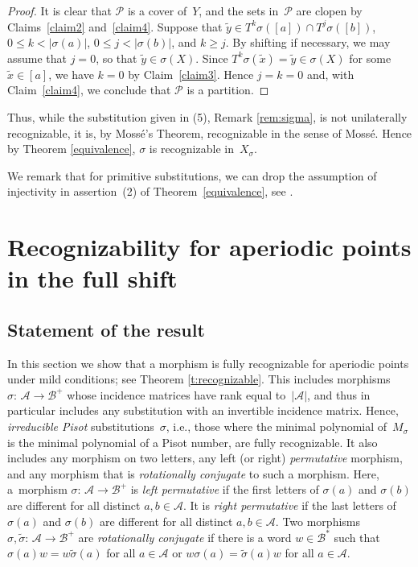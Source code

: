 \documentclass{amsart}
\theoremstyle{definition}
\theoremstyle{remark}
\numberwithin{equation}{section}
\begin{document}
\begin{proof}
It is clear that $\mathcal{P}$ is a cover of~$Y$, and the sets in~$\mathcal{P}$ are clopen by Claims~\ref{claim2} and~\ref{claim4}.  
Suppose that $\tilde{y} \in T^k \sigma([a]) \cap T^j \sigma([b])$, 
$0 \le k<|\sigma(a)|$, $0 \le j<|\sigma(b)|$, and $k\geq j$.
By shifting if necessary, we may assume that $j=0$, so that $\tilde{y} \in \sigma(X)$. 
Since $T^k \sigma(\tilde{x}) = \tilde{y} \in \sigma(X)$ for some $\tilde{x} \in [a]$, we have $k = 0$ by Claim~\ref{claim3}. 
Hence $j = k = 0$ and, with Claim~\ref{claim4}, we conclude that $\mathcal{P}$ is a partition. 
\end{proof}

Thus, while the substitution given in (5), Remark  \ref{rem:sigma}, is not unilaterally recognizable, it is, by Moss\'{e}'s Theorem,  recognizable in the sense of Moss\'{e}. Hence by Theorem \ref{equivalence}, $\sigma$ is recognizable in~$X_\sigma$.

We remark that for primitive substitutions, we can drop the assumption of injectivity in assertion~(2) of Theorem~\ref{equivalence}, see \cite{Mosse:92}. 



\section{Recognizability for aperiodic points in the full shift} \label{sec:recogn-with-resp}

\subsection{Statement of the result}
In this section we show that a morphism is fully recognizable for aperiodic points under mild conditions; see Theorem \ref{t:recognizable}. 
This includes morphisms $\sigma:\, \mathcal{A} \rightarrow \mathcal{B}^+$ whose incidence matrices have rank equal to~$|\mathcal{A}|$, and thus in particular includes any substitution with an invertible incidence matrix. 
Hence, \emph{irreducible Pisot} substitutions~$\sigma$, i.e., those where the minimal polynomial of~$M_\sigma$ is the minimal polynomial of a Pisot number, are fully recognizable.
It also includes any morphism on two letters, any left (or right) \emph{permutative} morphism, and any morphism that is \emph{rotationally conjugate} to such a morphism. 
Here, a~morphism $\sigma:\, \mathcal{A} \to \mathcal{B}^+$ is \emph{left permutative} if the first letters of $\sigma(a)$ and $\sigma(b)$ are different for all distinct $a,b \in \mathcal{A}$.
It is \emph{right permutative} if the last letters of $\sigma(a)$ and $\sigma(b)$ are different for all distinct $a,b \in \mathcal{A}$. 
Two morphisms $\sigma, \tilde{\sigma}:\, \mathcal{A} \to \mathcal{B}^+$ are \emph{rotationally conjugate} if there is a word $w \in \mathcal{B}^*$ such that $\sigma(a) w = w \tilde{\sigma}(a)$ for all $a \in \mathcal{A}$ or $w \sigma(a) = \tilde{\sigma}(a) w$ for all $a \in \mathcal{A}$.
\end{document}
